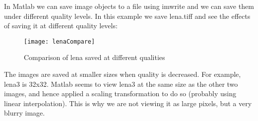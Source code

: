 In Matlab we can save image objects to a file using imwrite and we can save them
under different quality levels. In this example we save lena.tiff and see the
effects of saving it at different quality levels:

\begin{figure}[H]
    \centering
    \texttt{[image: lenaCompare]}
    \caption{Comparison of lena saved at different qualities}
\end{figure}

The images are saved at smaller sizes when quality is decreased. For example,
lena3 is 32x32. Matlab seems to view lena3 at the same size as the other two
images, and hence applied a scaling transformation to do so (probably using
linear interpolation). This is why we are not viewing it as large pixels, but a
very blurry image.
